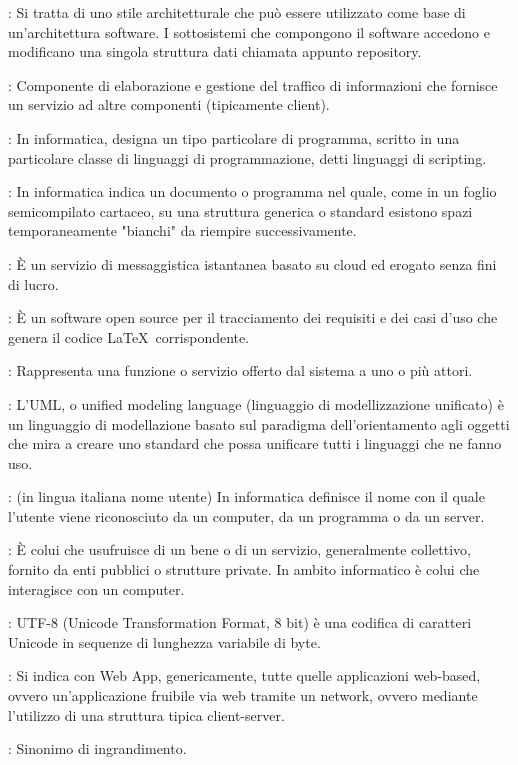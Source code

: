 {		: Si tratta di uno stile architetturale che può essere utilizzato come base di un'architettura software. I sottosistemi che compongono il software accedono e modificano una singola struttura dati chiamata appunto repository.	
			
		
		: Componente di elaborazione e gestione del traffico di informazioni che fornisce un servizio ad altre componenti (tipicamente client).
		
		: In informatica, designa un tipo particolare di programma, scritto in una particolare classe di linguaggi di programmazione, detti linguaggi di scripting.


		: In informatica indica un documento o programma nel quale, come in un foglio semicompilato cartaceo, su una struttura generica o standard esistono spazi temporaneamente "bianchi" da riempire successivamente.
		
		: È un servizio di messaggistica istantanea basato su cloud ed erogato senza fini di lucro.
		
		: È un software open source per il tracciamento dei requisiti e dei casi d'uso che genera il codice \LaTeX\ corrispondente.

		
		: Rappresenta una funzione o servizio offerto dal sistema a uno o più attori.
		
		: L'UML, o unified modeling language (linguaggio di modellizzazione unificato) è un linguaggio di modellazione basato sul paradigma dell'orientamento agli oggetti
che mira a creare uno standard che possa unificare tutti i linguaggi che ne fanno uso.
		
		: (in lingua italiana nome utente) In informatica definisce il nome con il quale l'utente viene riconosciuto da un computer, da un programma o da un server.
		
		: È colui che usufruisce di un bene o di un servizio, generalmente collettivo, fornito da enti pubblici o strutture private. In ambito informatico è colui che interagisce con un computer.
	
		: UTF-8 (Unicode Transformation Format, 8 bit) è una codifica di caratteri Unicode in sequenze di lunghezza variabile di byte.


		: Si indica con Web App, genericamente, tutte quelle applicazioni web-based, ovvero un'applicazione fruibile via web tramite un network, ovvero
mediante l'utilizzo di una struttura tipica client-server.


		: Sinonimo di ingrandimento.
	 }
	 
